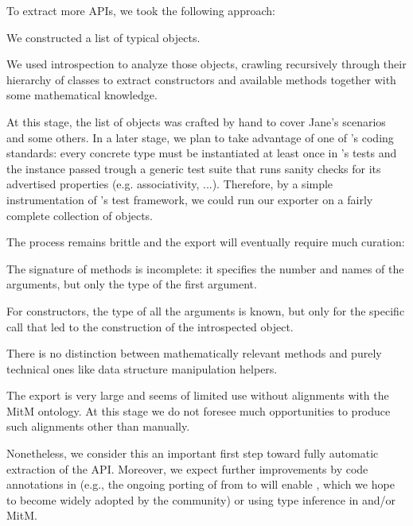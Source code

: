 To extract more APIs, we took the following approach:
\begin{compactenum}
\item We constructed a list of typical \Sage objects.
\item We used introspection to analyze those objects, crawling recursively through their hierarchy of classes to extract constructors and available methods together with some mathematical knowledge.
\end{compactenum}

At this stage, the list of objects was crafted by hand to cover Jane's scenarios and some others.
In a later stage, we plan to take advantage of one of \Sage's coding standards: every concrete type must be instantiated at least once in \Sage's tests and the instance passed
trough a generic test suite that runs sanity checks for its advertised
properties (e.g. associativity, ...).
Therefore, by a simple instrumentation of \Sage's test framework, we could run our exporter on a fairly complete collection of \Sage objects.

The process remains brittle and the export will eventually require much curation:
\begin{compactitem}
\item The signature of methods is incomplete: it specifies the number and names of the
  arguments, but only the type of the first argument.
\item For constructors, the type of all the arguments is known, but
  only for the specific call that led to the construction of the
  introspected object.
\item There is no distinction between mathematically relevant methods
  and purely technical ones like data structure manipulation helpers.
\item The export is very large and seems of limited use without
  alignments with the MitM ontology. At this stage we do not foresee
  much opportunities to produce such alignments other than manually.
\end{compactitem}

Nonetheless, we consider this an important first step toward fully automatic extraction of the \Sage API.
Moreover, we expect further improvements by code annotations in \Sage
(e.g., the ongoing porting of \Sage from  to  will enable , which we hope to become widely
adopted by the community) or using type inference in \Sage and/or MitM.

